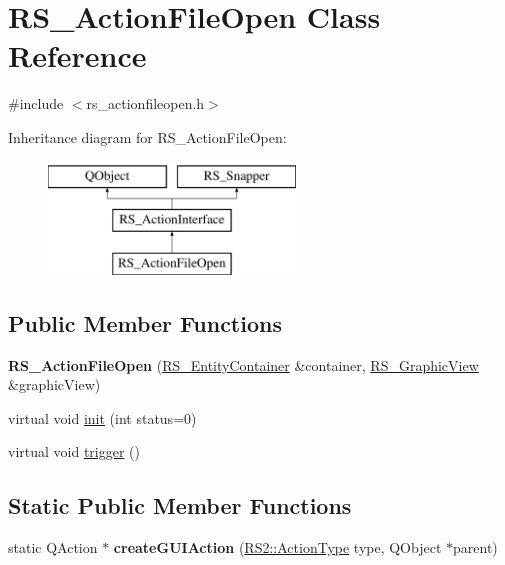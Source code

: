 \hypertarget{classRS__ActionFileOpen}{\section{R\-S\-\_\-\-Action\-File\-Open Class Reference}
\label{classRS__ActionFileOpen}
}


{\ttfamily \#include $<$rs\-\_\-actionfileopen.\-h$>$}

Inheritance diagram for R\-S\-\_\-\-Action\-File\-Open\-:\begin{figure}[H]
\begin{center}
\leavevmode
\includegraphics[height=3.000000cm]{classRS__ActionFileOpen}
\end{center}
\end{figure}
\subsection*{Public Member Functions}
\begin{DoxyCompactItemize}
\item 
\hypertarget{classRS__ActionFileOpen_ad64532231914bcdc60d54b663752f58a}{{\bfseries R\-S\-\_\-\-Action\-File\-Open} (\hyperlink{classRS__EntityContainer}{R\-S\-\_\-\-Entity\-Container} \&container, \hyperlink{classRS__GraphicView}{R\-S\-\_\-\-Graphic\-View} \&graphic\-View)}\label{classRS__ActionFileOpen_ad64532231914bcdc60d54b663752f58a}

\item 
virtual void \hyperlink{classRS__ActionFileOpen_a5cb312c3c0bc307bfa33fef47b832c5d}{init} (int status=0)
\item 
virtual void \hyperlink{classRS__ActionFileOpen_ab1d0e9decc05bd5dbe3460c890b0b350}{trigger} ()
\end{DoxyCompactItemize}
\subsection*{Static Public Member Functions}
\begin{DoxyCompactItemize}
\item 
\hypertarget{classRS__ActionFileOpen_a0d6539bed5bb0453567316da3b3c5fa8}{static Q\-Action $\ast$ {\bfseries create\-G\-U\-I\-Action} (\hyperlink{classRS2_afe3523e0bc41fd637b892321cfc4b9d7}{R\-S2\-::\-Action\-Type} type, Q\-Object $\ast$parent)}\label{classRS__ActionFileOpen_a0d6539bed5bb0453567316da3b3c5fa8}

\end{DoxyCompactItemize}
